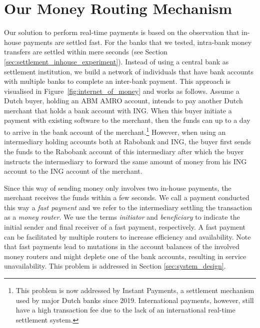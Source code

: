 \section{Our Money Routing Mechanism}
\label{sec:money_routing_mechanism}

Our solution to perform real-time payments is based on the observation that in-house payments are settled fast.
For the banks that we tested, intra-bank money transfers are settled within mere seconds (see Section \ref{sec:settlement_inhouse_experiment}).
Instead of using a central bank as settlement institution, we build a network of individuals that have bank accounts with multiple banks to complete an inter-bank payment.
This approach is visualised in Figure~\ref{fig:internet_of_money} and works as follows.
Assume a Dutch buyer, holding an ABM AMRO account, intends to pay another Dutch merchant that holds a bank account with ING.
When this buyer initiate a payment with existing software to the merchant, then the funds can up to a day to arrive in the bank account of the merchant.\footnote{This problem is now addressed by Instant Payments, a settlement mechanism used by major Dutch banks since 2019. International payments, however, still have a high transaction fee due to the lack of an international real-time settlement system.}
However, when using an intermediary holding accounts both at Rabobank and ING, the buyer first sends the funds to the Rabobank account of this intermediary after which the buyer instructs the intermediary to forward the same amount of money from his ING account to the ING account of the merchant.

Since this way of sending money only involves two in-house payments, the merchant receives the funds within a few seconds.
We call a payment conducted this way a \emph{fast payment} and we refer to the intermediary settling the transaction as a \emph{money router}.
We use the terms \emph{initiator} and \emph{beneficiary} to indicate the initial sender and final receiver of a fast payment, respectively.
A fast payment can be facilitated by multiple routers to increase efficiency and availability.
Note that fast payments lead to mutations in the account balances of the involved money routers and might deplete one of the bank accounts, resulting in service unavailability.
This problem is addressed in Section \ref{sec:system_design}.

